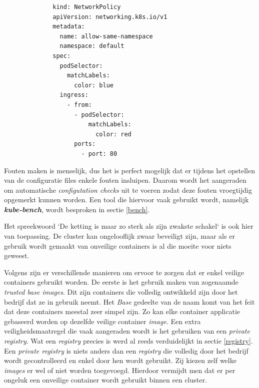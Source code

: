\begin{figure}[h!] \label{netpolicy}
    \begin{verbatim}
        kind: NetworkPolicy
        apiVersion: networking.k8s.io/v1
        metadata:
          name: allow-same-namespace
          namespace: default
        spec:
          podSelector:
            matchLabels:
              color: blue
          ingress:
            - from:
              - podSelector:
                  matchLabels:
                    color: red
              ports:
                - port: 80
    \end{verbatim}
\end{figure}

Fouten maken is menselijk, dus het is perfect mogelijk dat er tijdens het opstellen van de configuratie files enkele fouten insluipen. Daarom wordt het aangeraden om automatische \textit{configutation checks} uit te voeren zodat deze fouten vroegtijdig opgemerkt kunnen worden. Een tool die hiervoor vaak gebruikt wordt, namelijk \textbf{\textit{kube-bench}}, wordt besproken in sectie \ref{bench}.


Het spreekwoord `De ketting is maar zo sterk als zijn zwakste schakel` is ook hier van toepassing. De cluster kan ongelooflijk zwaar beveiligt zijn, maar als er gebruik wordt gemaakt van onveilige containers is al die moeite voor niets geweest.

Volgens \textcite{Lewis2019} zijn er verschillende manieren om ervoor te zorgen dat er enkel veilige containers gebruikt worden. De eerste is het gebruik maken van zogenaamde \textit{trusted base images}. Dit zijn containers die volledig ontwikkeld zijn door het bedrijf dat ze in gebruik neemt. Het \textit{Base} gedeelte van de naam komt van het feit dat deze containers meestal zeer simpel zijn. Zo kan elke container applicatie gebaseerd worden op dezelfde veilige container \textit{image}.
Een extra veiligheidsmaatregel die vaak aangeraden wordt is het gebruiken van een \textit{private registry}. Wat een \textit{registry} precies is werd al reeds verduidelijkt in sectie \ref{registry}. Een \textit{private registry} is niets anders dan een \textit{registry} die volledig door het bedrijf wordt gecontrolleerd en enkel door hen wordt gebruikt. Zij kiezen zelf welke \textit{images} er wel of niet worden toegevoegd. Hierdoor vermijdt men dat er per ongeluk een onveilige container wordt gebruikt binnen een cluster.


